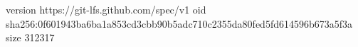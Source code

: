 version https://git-lfs.github.com/spec/v1
oid sha256:0f601943ba6ba1a853cd3cbb90b5adc710c2355da80fed5fd614596b673a5f3a
size 312317
